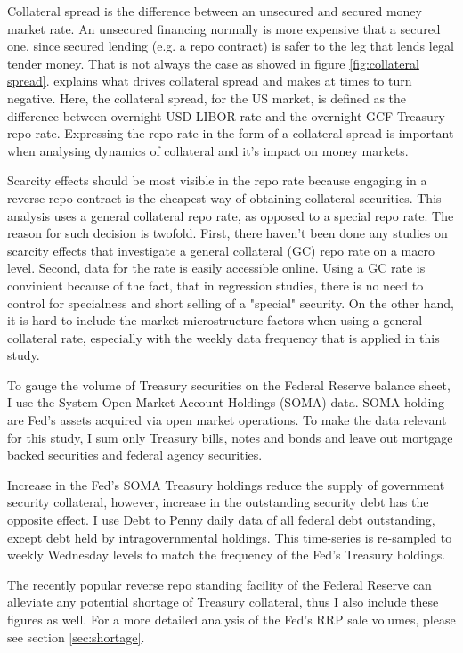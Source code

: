 \documentclass[11pt,a4paper,english,oneside]{article}
\begin{document}
Collateral spread is the difference between an unsecured and secured money market rate. An unsecured financing normally is more expensive that a secured one, since secured lending (e.g. a repo contract) is safer to the leg that lends legal tender money. That is not always the case as showed in figure \ref{fig:collateral spread}. \citet{nyborg2019a} explains what drives collateral spread and makes at times to turn negative. Here, the collateral spread, for the US market, is defined as the difference between overnight USD LIBOR rate and the overnight GCF Treasury repo rate. Expressing the repo rate in the form of a collateral spread is important when analysing dynamics of collateral and it's impact on money markets. %

Scarcity effects should be most visible in the repo rate because engaging in a reverse repo contract is the cheapest way of obtaining collateral securities. This analysis uses a general collateral repo rate, as opposed to a special repo rate. The reason for such decision is twofold. First, there haven't been done any studies on scarcity effects that investigate a general collateral (GC) repo rate on a macro level. Second, data for the rate is easily accessible online. Using a GC rate is convinient because of the fact, that in regression studies, there is no need to control for specialness and short selling of a "special" security. On the other hand, it is hard to include the market microstructure factors when using a general collateral rate, especially with the weekly data frequency that is applied in this study.

To gauge the volume of Treasury securities on the Federal Reserve balance sheet, I use the System Open Market Account Holdings (SOMA) data. SOMA holding are Fed's assets acquired via open market operations. To make the data relevant for this study, I sum only Treasury bills, notes and bonds and leave out mortgage backed securities and federal agency securities.

Increase in the Fed's SOMA Treasury holdings reduce the supply of government security collateral, however, increase in the outstanding security debt has the opposite effect. I use Debt to Penny daily data of all federal debt outstanding, except debt held by intragovernmental holdings. This time-series is re-sampled to weekly Wednesday levels to match the frequency of the Fed's Treasury holdings.

The recently popular reverse repo standing facility of the Federal Reserve can alleviate any potential shortage of Treasury collateral, thus I also include these figures as well. For a more detailed analysis of the Fed's RRP sale volumes, please see section \ref{sec:shortage}.
\end{document}
